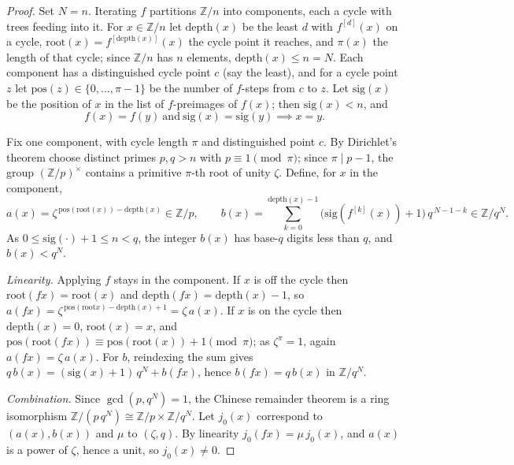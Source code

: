 \begin{proof}\leanok
Set $N = n$. Iterating $f$ partitions $\mathbb{Z}/n$ into components, each a cycle with trees
feeding into it. For $x \in \mathbb{Z}/n$ let $\mathrm{depth}(x)$ be the least $d$ with
$f^{[d]}(x)$ on a cycle, $\mathrm{root}(x) = f^{[\mathrm{depth}(x)]}(x)$ the cycle point it
reaches, and $\pi(x)$ the length of that cycle; since $\mathbb{Z}/n$ has $n$ elements,
$\mathrm{depth}(x) \le n = N$. Each component has a distinguished cycle point $c$ (say the
least), and for a cycle point $z$ let $\mathrm{pos}(z) \in \{0,\dots,\pi-1\}$ be the number of
$f$-steps from $c$ to $z$. Let $\mathrm{sig}(x)$ be the position of $x$ in the list of
$f$-preimages of $f(x)$; then $\mathrm{sig}(x) < n$, and
\begin{equation}\label{eq:sig}
  f(x) = f(y) \ \text{and}\ \mathrm{sig}(x) = \mathrm{sig}(y) \implies x = y. \tag{$\ast$}
\end{equation}

Fix one component, with cycle length $\pi$ and distinguished point $c$. By Dirichlet's theorem
choose distinct primes $p, q > n$ with $p \equiv 1 \pmod{\pi}$; since $\pi \mid p-1$, the group
$(\mathbb{Z}/p)^\times$ contains a primitive $\pi$-th root of unity $\zeta$. Define, for $x$ in
the component,
\[
  a(x) = \zeta^{\,\mathrm{pos}(\mathrm{root}(x)) - \mathrm{depth}(x)} \in \mathbb{Z}/p,
  \qquad
  b(x) = \sum_{k=0}^{\mathrm{depth}(x)-1} \bigl(\mathrm{sig}(f^{[k]}(x)) + 1\bigr)\,
         q^{\,N-1-k} \in \mathbb{Z}/q^{N}.
\]
As $0 \le \mathrm{sig}(\cdot)+1 \le n < q$, the integer $b(x)$ has base-$q$ digits less than
$q$, and $b(x) < q^{N}$.

\emph{Linearity.} Applying $f$ stays in the component. If $x$ is off the cycle then
$\mathrm{root}(f x) = \mathrm{root}(x)$ and $\mathrm{depth}(f x) = \mathrm{depth}(x) - 1$, so
$a(f x) = \zeta^{\,\mathrm{pos}(\mathrm{root} x) - \mathrm{depth}(x) + 1} = \zeta\, a(x)$. If
$x$ is on the cycle then $\mathrm{depth}(x) = 0$, $\mathrm{root}(x) = x$, and
$\mathrm{pos}(\mathrm{root}(f x)) \equiv \mathrm{pos}(\mathrm{root}(x)) + 1 \pmod{\pi}$; as
$\zeta^{\pi} = 1$, again $a(f x) = \zeta\, a(x)$. For $b$, reindexing the sum gives
$q\, b(x) = (\mathrm{sig}(x)+1)\,q^{N} + b(f x)$, hence $b(f x) = q\, b(x)$ in
$\mathbb{Z}/q^{N}$.

\emph{Combination.} Since $\gcd(p, q^{N}) = 1$, the Chinese remainder theorem is a ring
isomorphism $\mathbb{Z}/(p\,q^{N}) \cong \mathbb{Z}/p \times \mathbb{Z}/q^{N}$. Let $j_0(x)$
correspond to $(a(x), b(x))$ and $\mu$ to $(\zeta, q)$. By linearity
$j_0(f x) = \mu\, j_0(x)$, and $a(x)$ is a power of $\zeta$, hence a unit, so $j_0(x) \ne 0$.


\end{proof}
